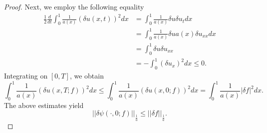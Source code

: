 \documentclass[10pt,a4paper]{amsart}
\begin{document}
\begin{proof}
Next, we employ the following equality
\begin{equation*}
  \begin{aligned}
        \frac{1}{2} \frac{d}{dt}\int_{0}^1 \frac{1}{a(x)}\left(\delta u(x,t)\right)^2 dx&= \int_{0}^1 \frac{1}{a(x)}\delta u \delta u_{t} dx\\& =\int_{0}^1 \frac{1}{a(x)}\delta u a(x) \delta u_{xx} dx\\&= \int_{0}^1 \delta u\delta u_{xx}\\&=- \int_{0}^1 (\delta u_{x})^2 dx \leqslant 0.
  \end{aligned}  
\end{equation*}
Integrating on $[0,T]$, we obtain 
$$\int_{0}^1 \frac{1}{a(x)}\left(\delta u(x,T;f)\right)^2 dx \leqslant \int_{0}^1 \frac{1}{a(x)}\left(\delta u(x,0;f)\right)^2 dx= \int_{0}^1 \frac{1}{a(x)}\vert\delta f\vert^2 dx.$$
The above estimates yield
$$\vert\vert\delta \psi(\cdot,0;f)\vert\vert_{\frac{1}{a}}\leqslant  \vert\vert\delta f\vert\vert_{\frac{1}{a}}.$$
\end{proof}
\end{document}
